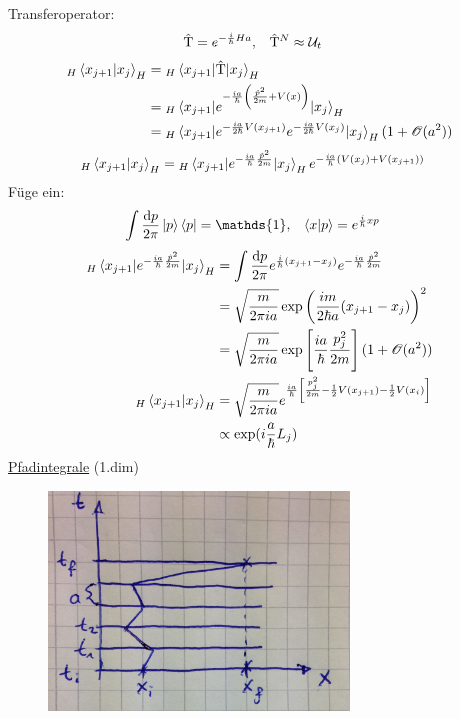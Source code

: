 Transferoperator:
	\begin{align*}
		\hat{\mathrm{T}} &= e^{-\frac{i}{\hbar} H a} ,&
		\hat{\mathrm{T}}^N &\approx \mathcal{U}_t
	\end{align*}
	\begin{align*}
		_H\braket{x_{j+1} | x_j}_H &= {}_H\braket{x_{j+1}| \hat{\mathrm{T}} | x_j}_H \\
		&= {}_H \braket{x_{j+1} | e^{-\frac{ia}{\hbar} \left(\frac{\hat{p}^2}{2m} + V(x)\right)} | x_j}_H \\
		&= {}_H \braket{x_{j+1} | e^{-\frac{ia}{2\hbar} V(x_{j+1})} e^{-\frac{ia}{2\hbar}V(x_j)} | x_j}_H (1 + \mathscr{O}(a^2))
	\end{align*}
	\begin{align*}
		_H\braket{x_{j+1} | x_j}_H &=
		{}_H\braket{x_{j+1} | e^{-\frac{ia}{\hbar} \frac{\hat{p}^2}{2m}} | x_j}_H
		e^{-\frac{ia}{\hbar} \left(V(x_j) + V(x_{j + 1})\right)}
	\end{align*}
Füge ein:
	\begin{align*}
		\int \frac{\diff p}{2 \pi} \ket{p} \bra{p} &= \mathds{1} ,& 
		\braket{x | p} &= e^{\frac{i}{\hbar} xp}
	\end{align*}
	\begin{align*}
		_H\braket{x_{j+1} | e^{-\frac{ia}{\hbar} \frac{\hat{p}^2}{2m}}| x_j}_H
		&= \int \frac{\mathrm{d} p}{2 \pi} e^{\frac{i}{\hbar} (x_{j+1} - x_j)}  e^{-\frac{ia}{\hbar} \frac{\hat{p}^2}{2m}} \\
		&= \sqrt{\frac{m}{2 \pi i a}} \exp\left(\frac{im}{2 \hbar a} (x_{j+1} - x_j)\right)^2 \\
		&= \sqrt{\frac{m}{2 \pi i a}} \exp\left[\frac{ia}{\hbar} \frac{p_j^2}{2m}\right]
		(1 + \mathscr{O}(a^2)) \\
		_H\braket{x_{j+1} | x_j}_H &=
		\sqrt{\frac{m}{2 \pi i a}} e^{\frac{ia}{\hbar} \left[\frac{p_j^2}{2m} - \frac{1}{2} V(x_{j+1}) - \frac{1}{2} V(x_i)\right]} \\
		&\propto \exp (i \frac{a}{\hbar} L_j)
	\end{align*}
\underline{Pfadintegrale} (1.dim) 
	\begin{figure} [h]
		\begin{center}
			\includegraphics[width=8cm]{Uebergangsamplituden2}
		\end{center}
	\end{figure}
